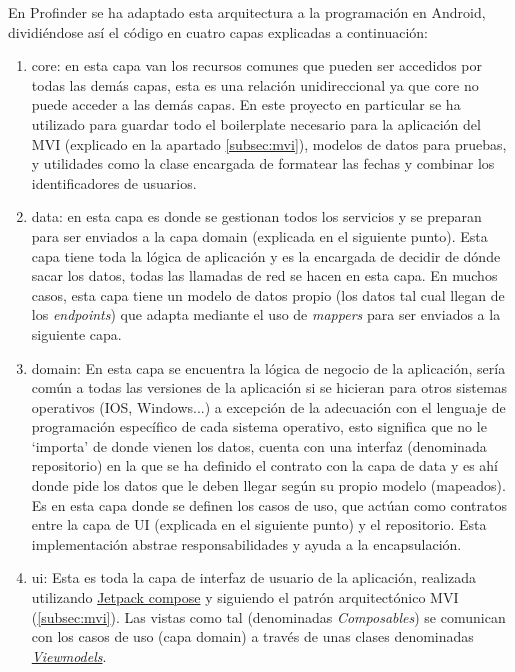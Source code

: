 En Profinder se ha adaptado esta arquitectura a la programación en Android, dividiéndose así el código en cuatro capas explicadas a continuación:
\begin{enumerate}
    \item core: en esta capa van los recursos comunes que pueden ser accedidos por todas las demás capas, esta es una relación unidireccional ya que core no puede acceder a las demás capas. En este proyecto en particular se ha utilizado para guardar todo el boilerplate necesario para la aplicación del MVI (explicado en la apartado \ref{subsec:mvi}), modelos de datos para pruebas, y utilidades como la clase encargada de formatear las fechas y combinar los identificadores de usuarios.
    \item data: en esta capa es donde se gestionan todos los servicios y se preparan para ser enviados a la capa domain (explicada en el siguiente punto). Esta capa tiene toda la lógica de aplicación y es la encargada de decidir de dónde sacar los datos, todas las llamadas de red se hacen en esta capa. En muchos casos, esta capa tiene un modelo de datos propio (los datos tal cual llegan de los \textit{endpoints}) que adapta mediante el uso de \textit{mappers} para ser enviados a la siguiente capa.
    \item domain: En esta capa se encuentra la lógica de negocio de la aplicación, sería común a todas las versiones de la aplicación si se hicieran para otros sistemas operativos (IOS, Windows...) a excepción de la adecuación con el lenguaje de programación específico de cada sistema operativo, esto significa que no le ‘importa’ de donde vienen los datos, cuenta con una interfaz (denominada repositorio) en la que se ha definido el contrato con la capa de data y es ahí donde pide los datos que le deben llegar según su propio modelo (mapeados). Es en esta capa donde se definen los casos de uso, que actúan como contratos entre la capa de UI (explicada en el siguiente punto) y el repositorio. Esta implementación abstrae responsabilidades y ayuda a la encapsulación. 
    \item ui: Esta es toda la capa de interfaz de usuario de la aplicación, realizada utilizando \hyperlink{subsec:compose}{Jetpack compose} y siguiendo el patrón arquitectónico  MVI (\ref{subsec:mvi}). Las vistas como tal (denominadas \textit{Composables}) se comunican con los casos de uso (capa domain) a través de unas clases denominadas \href{https://developer.android.com/topic/libraries/architecture/viewmodel}{\textit{Viewmodels}}.

\end{enumerate}
\hypertarget{subsec:mvi}{}
